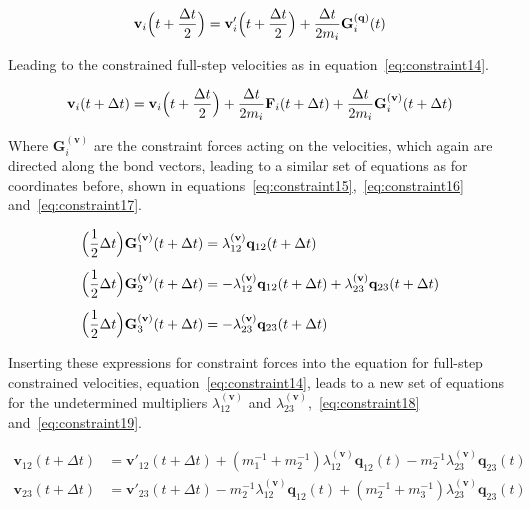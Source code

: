 \documentclass[11pt]{article}
\begin{document}
\begin{equation}
  \mathbf{v}_i\Bigl(t + \frac{\Delta t}{2}\Bigr) = \mathbf{v}'_i\Bigl(t + \frac{\Delta t}{2}\Bigr) + \frac{\Delta t}{2m_i}\mathbf{G}_i^{\mathbf{(q)}}(t)
  \label{eq:constraint13}
\end{equation}

\bigskip

\noindent Leading to the constrained full-step velocities as in equation~\ref{eq:constraint14}.

\begin{equation}
  \mathbf{v}_i(t + \Delta t) =\mathbf{v}_i\Bigl(t+\frac{\Delta t}{2}\Bigr) + \frac{\Delta t}{2m_i}\mathbf{F}_i(t + \Delta t)+ \frac{\Delta t}{2m_i}\mathbf{G}_i^{\mathbf{(v)}}(t+\Delta t)
  \label{eq:constraint14}
\end{equation}

\bigskip

\noindent Where $\mathbf{G}_i^{\mathbf{(v)}}$ are the constraint forces acting on the velocities, which again are directed along the bond vectors, leading to a similar set of equations as for coordinates before, shown in equations~\ref{eq:constraint15},~\ref{eq:constraint16} and~\ref{eq:constraint17}.

\begin{align}
  &\Bigl(\frac{1}{2}\Delta t\Bigr)\mathbf{G}_1^{\mathbf{(v)}}(t + \Delta t) = \lambda_{12}^{(\mathbf{v})}\mathbf{q}_{12}(t + \Delta t)
  \label{eq:constraint15}\\[5pt]
  &\Bigl(\frac{1}{2}\Delta t\Bigr)\mathbf{G}_2^{\mathbf{(v)}}(t + \Delta t) = -\lambda_{12}^{(\mathbf{v})}\mathbf{q}_{12}(t + \Delta t) + \lambda_{23}^{(\mathbf{v})}\mathbf{q}_{23}(t + \Delta t)
  \label{eq:constraint16}\\[5pt]
  &\Bigl(\frac{1}{2}\Delta t\Bigr)\mathbf{G}_3^{\mathbf{(v)}}(t + \Delta t) = -\lambda_{23}^{(\mathbf{v})}\mathbf{q}_{23}(t + \Delta t)
  \label{eq:constraint17}
\end{align}

\bigskip

\noindent Inserting these expressions for constraint forces into the equation for full-step constrained velocities, equation~\ref{eq:constraint14}, leads to a new set of equations for the undetermined multipliers $\lambda_{12}^{(\mathbf{v})}$ and $\lambda_{23}^{(\mathbf{v})}$,~\ref{eq:constraint18} and~\ref{eq:constraint19}.

\begin{align}
  \mathbf{v}_{12}(t + \Delta t) &= \mathbf{v}'_{12}(t + \Delta t) + (m_1^{-1} + m_2^{-1})\lambda^{(\mathbf{v})}_{12}\mathbf{q}_{12}(t)-m_2^{-1}\lambda^{(\mathbf{v})}_{23}\mathbf{q}_{23}(t) 
  \label{eq:constraint18}\\[5pt]
  \mathbf{v}_{23}(t + \Delta t) &= \mathbf{v}'_{23}(t + \Delta t) - m_2^{-1}\lambda^{(\mathbf{v})}_{12}\mathbf{q}_{12}(t)+(m_2^{-1} + m_3^{-1})\lambda^{(\mathbf{v})}_{23}\mathbf{q}_{23}(t)
  \label{eq:constraint19}
\end{align}
\end{document}
